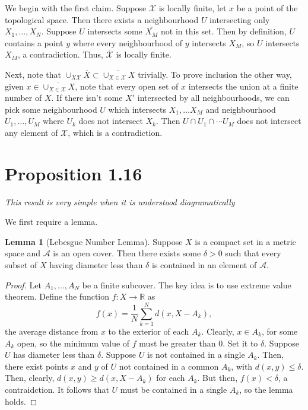 \documentclass[aps,pra,showpacs,notitlepage,onecolumn,superscriptaddress,nofootinbib]{revtex4-1}
\theoremstyle{definition}
\newtheorem{lemma}{Lemma}[section]
\begin{document}
\noindent
We begin with the first claim. Suppose $\mathcal{X}$ is locally finite, let $x$ be a point of the topological space. Then there exists a neighbourhood $U$ intersecting only $X_1, \dots, X_N$. Suppose $U$ intersects
some $\overline{X_M}$ not in this set. Then by definition, $U$ contains a point $y$ where every neighbourhood of $y$ intersects $X_M$, so $U$ intersects $X_M$, a contradiction. Thus, $\overline{\mathcal{X}}$ is locally finite.

Next, note that $\cup_{X \mathcal{X}} \overline{X} \subset \overline{\cup_{X \in \mathcal{X}} X}$ trivially. To prove inclusion the other way, given $x \in \overline{\cup_{X \in \mathcal{X}} X}$, note that every open set of $x$ intersects the union at a finite number of $X$. If there isn't some $X'$ intersected by all neighbourhoods, we can pick some neighbourhood $U$ which intersects $X_1, \dots X_M$ and neighbourhood $U_1, \dots, U_M$ where $U_k$ does not intersect $X_k$. Then $U \cap U_1 \cap \cdots U_M$ does not intersect any element of $\mathcal{X}$, which is a contradiction.

\hrulefill

\section{Proposition 1.16}

\noindent
\textit{This result is very simple when it is understood diagramatically}
\newline

\noindent
We first require a lemma.
\begin{lemma}[Lebesgue Number Lemma]
Suppose $X$ is a compact set in a metric space and $\mathcal{A}$ is an open cover. Then there exists some $\delta > 0$ such that every subset of $X$ having diameter less than $\delta$ is contained in an element of $\mathcal{A}$.
\end{lemma}
\begin{proof}
  Let $A_1, \dots, A_N$ be a finite subcover. The key idea is to use extreme value theorem. Define the function $f : X \rightarrow \mathbb{R}$ as
  \begin{equation}
    f(x) = \frac{1}{N} \displaystyle\sum_{k = 1}^{N} d(x, X - A_k),
    \end{equation}
  the average distance from $x$ to the exterior of each $A_k$. Clearly, $x \in A_k$, for some $A_k$ open, so the minimum value of $f$ must be greater than $0$. Set it to $\delta$. Suppose $U$ has diameter less than
  $\delta$. Suppose $U$ is not contained in a single $A_k$. Then, there exist points $x$ and $y$ of $U$ not contained in a common $A_k$, with $d(x, y) \leq \delta$. Then, clearly, $d(x, y) \geq d(x, X - A_k)$ for each $A_k$.
  But then, $f(x) < \delta$, a contraidction. It follows that $U$ must be contained in a single $A_k$, so the lemma holds.
  \end{proof}
\end{document}

